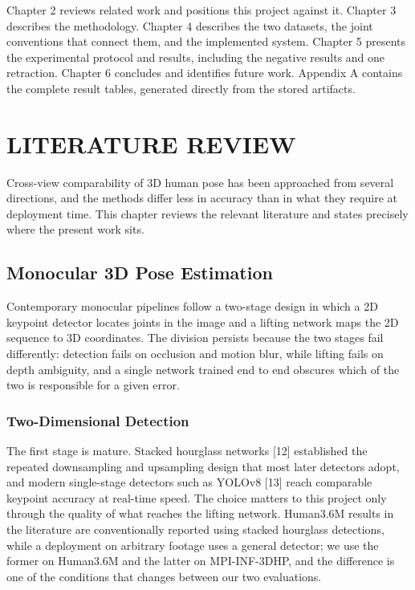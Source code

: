 \documentclass[12pt,a4paper]{report}
\begin{document}
 Chapter 2 reviews related work and positions this project against it. Chapter 3 describes the methodology. Chapter 4 describes the two datasets, the joint conventions that connect them, and the implemented system. Chapter 5 presents the experimental protocol and results, including the negative results and one retraction. Chapter 6 concludes and identifies future work. Appendix A contains the complete result tables, generated directly from the stored artifacts.

\chapter{LITERATURE REVIEW}

Cross-view comparability of 3D human pose has been approached from several directions, and the methods differ less in accuracy than in what they require at deployment time. This chapter reviews the relevant literature and states precisely where the present work sits.

\section{Monocular 3D Pose Estimation}

Contemporary monocular pipelines follow a two-stage design in which a 2D keypoint detector locates joints in the image and a lifting network maps the 2D sequence to 3D coordinates. The division persists because the two stages fail differently: detection fails on occlusion and motion blur, while lifting fails on depth ambiguity, and a single network trained end to end obscures which of the two is responsible for a given error.

\subsection{Two-Dimensional Detection}

The first stage is mature. Stacked hourglass networks [12] established the repeated downsampling and upsampling design that most later detectors adopt, and modern single-stage detectors such as YOLOv8 [13] reach comparable keypoint accuracy at real-time speed. The choice matters to this project only through the quality of what reaches the lifting network. Human3.6M results in the literature are conventionally reported using stacked hourglass detections, while a deployment on arbitrary footage uses a general detector; we use the former on Human3.6M and the latter on MPI-INF-3DHP, and the difference is one of the conditions that changes between our two evaluations.
\end{document}
